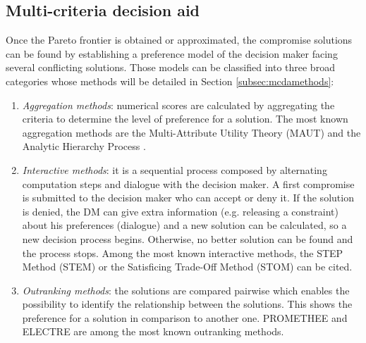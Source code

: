 \subsection{Multi-criteria decision aid}
\label{subsec:mcda}
Once the Pareto frontier is obtained or approximated, the compromise solutions can be found by establishing a preference model of the decision maker facing several conflicting solutions. Those models can be classified into three broad categories \cite{Vin92, beltstew} whose methods will be detailed in Section \ref{subsec:mcdamethods}:

\begin{enumerate}
\item \textit{Aggregation methods}: numerical scores are calculated by aggregating the criteria to determine the level of preference for a solution. The most known aggregation methods are the Multi-Attribute Utility Theory (MAUT) \cite{MMAUT} and the Analytic Hierarchy Process \cite{MAHP}.
\item \textit{Interactive methods}: it is a sequential process composed by alternating computation steps and dialogue with the decision maker. A first compromise is submitted to the decision maker who can accept or deny it. If the solution is denied, the DM can give extra information (e.g. releasing a constraint) about his preferences (dialogue) and a new solution can be calculated, so a new decision process begins. Otherwise, no better solution can be found and the process stops. Among the most known interactive methods, the STEP Method (STEM) \cite{benayoun71} or the Satisficing Trade-Off Method (STOM) \cite{nakayama84} can be cited.
\item \textit{Outranking methods}: the solutions are compared pairwise which enables the possibility to identify the relationship between the solutions. This shows the preference for a solution in comparison to another one. PROMETHEE \cite{Brans1} and ELECTRE \cite{Roy66} are among the most known outranking methods.
\end{enumerate}


